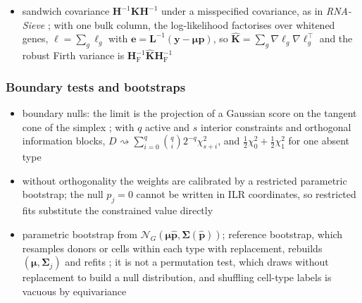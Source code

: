 \begin{itemize}
        for \(\nu_{j}=C_{j}-1>G+1\); the factor \((\nu_{j}-G-1)/\nu_{j}\) corrects it, and \emph{DECALS} corrects its own
        covariance estimator \cite{caiStatisticalInferenceCelltype2024}
  \item sandwich covariance \(\boldsymbol{H}^{-1}\boldsymbol{K}\boldsymbol{H}^{-1}\) under a misspecified covariance, as in
        \emph{RNA-Sieve} \cite{erdmann-phamLikelihoodbasedDeconvolutionBulk2021}; with one bulk column, the log-likelihood
        factorises over whitened genes, \(\ell=\sum_{g}\ell_{g}\) with
        \(\boldsymbol{e}=\boldsymbol{L}^{-1}(\boldsymbol{y}-\boldsymbol{\mu}\boldsymbol{p})\), so
        \(\hat{\boldsymbol{K}}=\sum_{g}\nabla\ell_{g}\nabla\ell_{g}^{\top}\) and the robust Firth variance is
        \(\boldsymbol{H}_{\mathrm{F}}^{-1}\hat{\boldsymbol{K}}\boldsymbol{H}_{\mathrm{F}}^{-1}\)
\end{itemize}

\subsubsection{Boundary tests and bootstraps}
\label{app:mle-boundary}

\begin{itemize}
  \item boundary nulls: the limit is the projection of a Gaussian score on the tangent cone of the simplex
        \cite{selfAsymptoticPropertiesMaximum1987}; with \(q\) active and \(s\) interior constraints and orthogonal
        information blocks, \(D\rightsquigarrow\sum_{i=0}^{q}\binom{q}{i}2^{-q}\chi^{2}_{s+i}\), and
        \(\tfrac12\chi^{2}_{0}+\tfrac12\chi^{2}_{1}\) for one absent type \cite{hermanDistributionLikelihoodRatio1954}
  \item without orthogonality the weights are calibrated by a restricted parametric bootstrap; the null \(p_{j}=0\)
        cannot be written in ILR coordinates, so restricted fits substitute the constrained value directly
  \item parametric bootstrap from \(\mathcal{N}_{G}(\boldsymbol{\mu}\hat{\boldsymbol{p}},\boldsymbol{\Sigma}(\hat{\boldsymbol{p}}))\); reference bootstrap,
        which resamples donors or cells within each type with replacement, rebuilds \((\boldsymbol{\mu},\boldsymbol{\Sigma}_{j})\) and refits
        \cite{efronBootstrapMethodsAnother1979}; it is not a permutation test, which draws without replacement
        to build a null distribution, and shuffling cell-type labels is vacuous by equivariance
\end{itemize}

